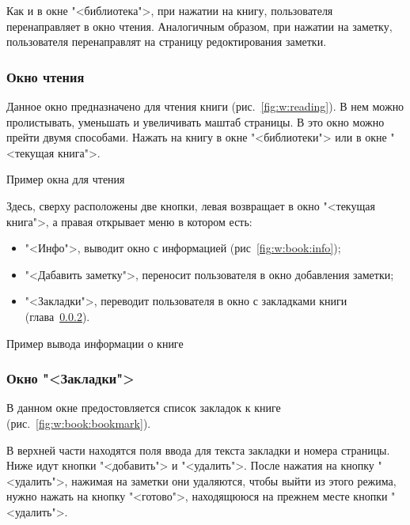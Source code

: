 Как и в окне "<библиотека">, при нажатии на книгу, пользователя
перенаправляет в окно чтения. Аналогичным образом,
при нажатии на заметку, пользователя перенаправлят на страницу
редоктирования заметки.

\subsubsection{Окно чтения}
Данное окно предназначено для чтения книги (рис.~\ref{fig:w:reading}).
В нем можно пролистывать, уменьшать и увеличивать маштаб страницы.
В это окно можно прейти двумя способами. Нажать на книгу в
окне "<библиотеки"> или в окне "<текущая книга">.

\begin{image}
	\caption{Пример окна для чтения}
	\label{fig:w:reading}
\end{image}

Здесь, сверху расположены две кнопки, левая возвращает в окно
"<текущая книга">, а правая открывает меню в котором есть:

\begin{itemize}
	\item "<Инфо">, выводит окно с информацией (рис~\ref{fig:w:book:info});
	\item "<Дабавить заметку">, переносит пользователя в окно добавления
		заметки;
	\item "<Закладки">, переводит пользователя в окно с закладками книги
		(глава~\ref{sct:bookmark}).
\end{itemize}

\begin{image}
	\caption{Пример вывода информации о книге}
	\label{fig:w:book:info}
\end{image}

\subsubsection{Окно "<Закладки">}\label{sct:bookmark}
В данном окне предостовляется список закладок к книге
(рис.~\ref{fig:w:book:bookmark}).\par
В верхней части находятся поля ввода для текста закладки и номера страницы.
Ниже идут кнопки "<добавить"> и "<удалить">. После нажатия на кнопку
"<удалить">, нажимая на заметки они удаляются,
чтобы выйти из этого режима, нужно нажать на кнопку "<готово">,
находящююся на прежнем месте кнопки "<удалить">.

